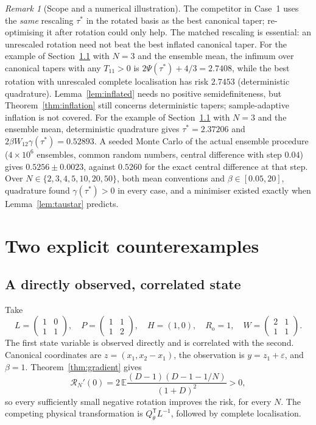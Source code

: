 \documentclass[11pt,a4paper]{article}
\numberwithin{equation}{section}
\theoremstyle{remark}\newtheorem{remark}[theorem]{Remark}
\newcommand{\E}{\mathbb E}
\newcommand{\risk}{\mathcal R}
\newcommand{\T}{^{\mathsf T}}
\newcommand{\Rn}{R_{\mathrm o}}
\begin{document}
\begin{remark}[Scope and a numerical illustration]\label{rem:inflation}
The competitor in Case~1 uses the \emph{same} rescaling \(\tau^*\) in the rotated basis as the
best canonical taper; re-optimising it after rotation could only help. The matched rescaling is
essential: an unrescaled rotation need not beat the best inflated canonical taper. For the
example of Section~\ref{sec:example1} with \(N=3\) and the ensemble mean, the infimum over
canonical tapers with any \(T_{11}>0\) is \(2\Psi(\tau^*)+4/3=2.7408\), while the best rotation with
unrescaled complete localisation has risk \(2.7453\) (deterministic quadrature). Lemma~\ref{lem:inflated} needs no positive semidefiniteness, but
Theorem~\ref{thm:inflation} still concerns deterministic tapers; sample-adaptive inflation is
not covered. For the example of Section~\ref{sec:example1} with \(N=3\) and the ensemble mean,
deterministic quadrature gives \(\tau^*=2.37206\) and
\(2\beta W_{12}\gamma(\tau^*)=0.52893\). A seeded Monte Carlo of the actual ensemble procedure
(\(4\times10^6\) ensembles, common random numbers, central difference with step \(0.04\)) gives
\(0.5256\pm0.0023\), against \(0.5260\) for the exact central difference at that step. Over
\(N\in\{2,3,4,5,10,20,50\}\), both mean conventions and \(\beta\in[0.05,20]\), quadrature found
\(\gamma(\tau^*)>0\) in every case, and a minimiser existed exactly when
Lemma~\ref{lem:taustar} predicts.
\end{remark}

\section{Two explicit counterexamples}\label{sec:examples}

\subsection{A directly observed, correlated state}\label{sec:example1}

Take
\begin{equation}\label{eq:example}
 L=\begin{pmatrix}1&0\\1&1\end{pmatrix},\quad
 P=\begin{pmatrix}1&1\\1&2\end{pmatrix},\quad
 H=(1,0),\quad \Rn=1,\quad
 W=\begin{pmatrix}2&1\\1&1\end{pmatrix}.
\end{equation}
The first state variable is observed directly and is correlated with the second.
Canonical coordinates are \(z=(x_1,x_2-x_1)\), the observation is \(y=z_1+\varepsilon\), and
\(\beta=1\). Theorem~\ref{thm:gradient} gives
\[
 \risk_N'(0)=2\,\E\frac{(D-1)(D-1-1/N)}{(1+D)^2}>0 ,
\]
so every sufficiently small negative rotation improves the risk, for every \(N\). The
competing physical transformation is \(Q_\theta\T L^{-1}\), followed by complete localisation.
\end{document}

